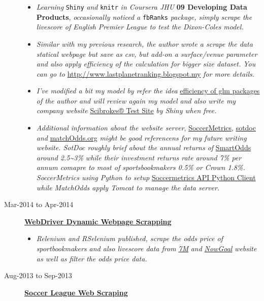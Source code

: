 \documentclass[]{article}
\providecommand{\tightlist}{%
  \setlength{\itemsep}{0pt}\setlength{\parskip}{0pt}}
\begin{document}
\begin{description}
\begin{itemize}
\tightlist
\item
  \emph{Learning} \texttt{Shiny} \emph{and} \texttt{knitr} \emph{in
  Coursera JHU} \textbf{09 Developing Data Products}, \emph{occasionally
  noticed a} \texttt{fbRanks} \emph{package, simply scrape the livescore
  of English Premier League to test the Dixon-Coles model.}
\item
  \emph{Similar with my previous research, the author wrote a scrape the
  data statical webpage but save as csv, but add-on a surface/venue
  parameter and also apply efficiency of the calculation for bigger size
  dataset. You can go to} \url{http://www.lastplanetranking.blogspot.my}
  \emph{for more details.}
\item
  \emph{I've modified a bit my model by refer the idea}
  \href{http://stackoverflow.com/questions/19532651/benchmarking-logistic-regression-using-glm-fit-bigglm-speedglm-glmnet-libli}{efficiency
  of glm packages} \emph{of the author and will review again my model
  and also write my company website}
  \href{http://www.scibrokes.com/Test/}{Scibrokes® Test Site} \emph{by
  Shiny when free.}
\item
  \emph{Additional information about the website server},
  \href{http://www.soccermetrics.net/}{SoccerMetrics},
  \href{http://www.sotdoc.co.uk/}{sotdoc} \emph{and}
  \href{http://www.matchodds.org}{matchOdds.org} \emph{might be good
  referencens for my future writing website. SotDoc roughly brief about
  the annual returns of} \href{http://www.smartodds.co.uk/}{SmartOdds}
  \emph{around 2.5\textasciitilde{}3\% while their investment returns
  rate around 7\% per annum comapre to most of sportsbookmakers 0.5\% or
  Crown 1.8\%. SoccerMetrics using Python to setup}
  \href{https://github.com/englianhu/soccermetrics-client-py}{Soccermetrics
  API Python Client} \emph{while MatchOdds apply Tomcat to manage the
  data server.}
\end{itemize}
\item[Mar-2014 to Apr-2014]
\href{https://github.com/Scibrokes/WebDriver-DynamicWebpage-Scrapping}{\textbf{WebDriver
Dynamic Webpage Scrapping}}

\begin{itemize}
\tightlist
\item
  \emph{Relenium and RSelenium published, scrape the odds price of
  sportbookmakers and also livescore data from}
  \href{http://odds.7m.hk/en/}{\emph{7M}} \emph{and}
  \href{http://info.nowgoal.com/en/}{\emph{NowGoal}} \emph{website as
  well as filter the odds price data.}
\end{itemize}
\item[Aug-2013 to Sep-2013]
\href{https://github.com/Scibrokes/Soccer-League-Web-Scraping}{\textbf{Soccer
League Web Scraping}}


\end{description}
\end{document}
